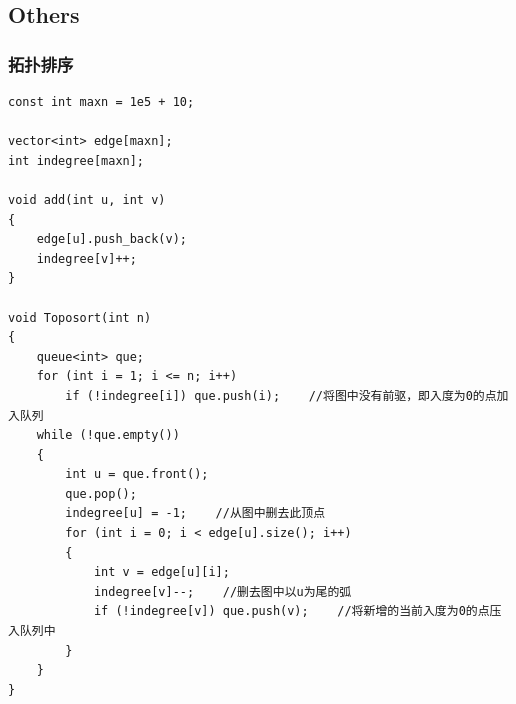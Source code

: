 \documentclass[twoside]{article}
\begin{document}
\subsection{Others}
\subsubsection{拓扑排序}
\begin{lstlisting}
const int maxn = 1e5 + 10;

vector<int> edge[maxn];
int indegree[maxn];

void add(int u, int v)
{
    edge[u].push_back(v);
    indegree[v]++;
}

void Toposort(int n)
{
    queue<int> que;
    for (int i = 1; i <= n; i++)
        if (!indegree[i]) que.push(i);    //将图中没有前驱，即入度为0的点加入队列
    while (!que.empty())
    {
        int u = que.front();
        que.pop();
        indegree[u] = -1;    //从图中删去此顶点	
        for (int i = 0; i < edge[u].size(); i++)
        {
            int v = edge[u][i];
            indegree[v]--;    //删去图中以u为尾的弧
            if (!indegree[v]) que.push(v);    //将新增的当前入度为0的点压入队列中
        }
    }
}\end{lstlisting}
\end{document}
